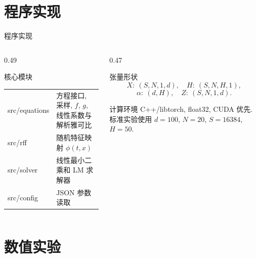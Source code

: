 \documentclass[aspectratio=169, 10pt, fontset=fandol]{ctexbeamer}
\begin{document}
\section{程序实现}

\begin{frame}{程序实现}
  \begin{columns}[T,onlytextwidth]
    \begin{column}{0.49\textwidth}
      \begin{block}{核心模块}
        \begin{tabularx}{\textwidth}{>{\ttfamily\footnotesize}l X}
          \toprule
          src/equations & 方程接口, 采样, $f$, $g$, 线性系数与解析雅可比\\
          src/rff & 随机特征映射 $\phi(t,x)$\\
          src/solver & 线性最小二乘和 LM 求解器\\
          src/config & JSON 参数读取\\
          \bottomrule
        \end{tabularx}
      \end{block}
    \end{column}
    \begin{column}{0.47\textwidth}
      \begin{block}{张量形状}
        \begin{equation*}
          X:\ (S,N,1,d),\quad
          H:\ (S,N,H,1),
        \end{equation*}
        \begin{equation*}
          \alpha:\ (d,H),\quad
          Z:\ (S,N,1,d).
        \end{equation*}
      \end{block}
      \begin{block}{计算环境}
        C++/libtorch, float32, CUDA 优先. 标准实验使用 $d=100$, $N=20$, $S=16384$, $H=50$.
      \end{block}
    \end{column}
  \end{columns}
\end{frame}

\section{数值实验}
\end{document}
